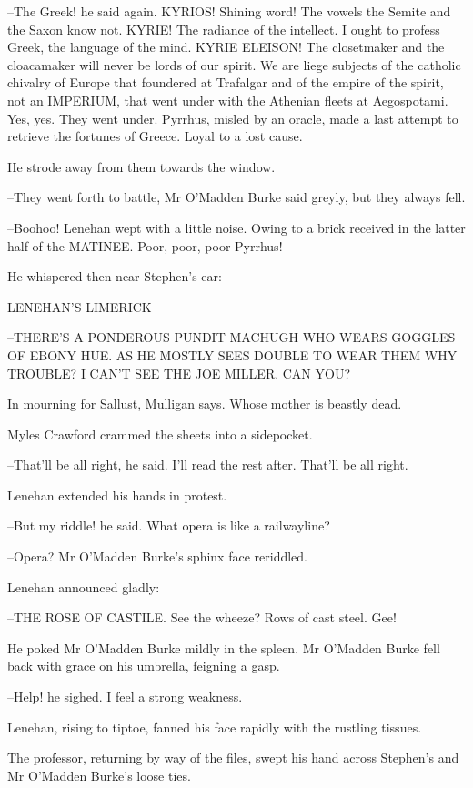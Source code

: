 --The Greek! he said again. KYRIOS! Shining word! The vowels the Semite
and the Saxon know not. KYRIE! The radiance of the intellect. I ought to
profess Greek, the language of the mind. KYRIE ELEISON! The closetmaker
and the cloacamaker will never be lords of our spirit. We are liege
subjects of the catholic chivalry of Europe that foundered at Trafalgar
and of the empire of the spirit, not an IMPERIUM, that went under with the
Athenian fleets at Aegospotami. Yes, yes. They went under. Pyrrhus, misled
by an oracle, made a last attempt to retrieve the fortunes of Greece.
Loyal to a lost cause.

He strode away from them towards the window.

--They went forth to battle, Mr O'Madden Burke said greyly, but they
always fell.

--Boohoo! Lenehan wept with a little noise. Owing to a brick received in
the latter half of the MATINEE. Poor, poor, poor Pyrrhus!

He whispered then near Stephen's ear:


    LENEHAN'S LIMERICK

  --THERE'S A PONDEROUS PUNDIT MACHUGH
    WHO WEARS GOGGLES OF EBONY HUE.
    AS HE MOSTLY SEES DOUBLE
    TO WEAR THEM WHY TROUBLE?
    I CAN'T SEE THE JOE MILLER. CAN YOU?


In mourning for Sallust, Mulligan says. Whose mother is beastly dead.

Myles Crawford crammed the sheets into a sidepocket.

--That'll be all right, he said. I'll read the rest after. That'll be all
right.

Lenehan extended his hands in protest.

--But my riddle! he said. What opera is like a railwayline?

--Opera? Mr O'Madden Burke's sphinx face reriddled.

Lenehan announced gladly:


--THE ROSE OF CASTILE. See the wheeze? Rows of cast steel. Gee!

He poked Mr O'Madden Burke mildly in the spleen. Mr O'Madden Burke
fell back with grace on his umbrella, feigning a gasp.

--Help! he sighed. I feel a strong weakness.

Lenehan, rising to tiptoe, fanned his face rapidly with the rustling
tissues.

The professor, returning by way of the files, swept his hand across
Stephen's and Mr O'Madden Burke's loose ties.

